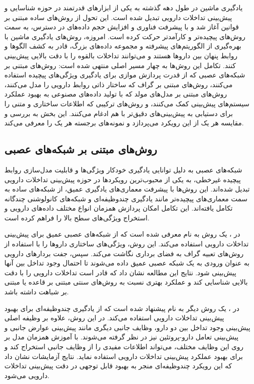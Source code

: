 یادگیری ماشین در طول دهه گذشته به یکی از ابزارهای قدرتمند در حوزه شناسایی و پیش‌بینی تداخلات دارویی تبدیل شده است. این تحول از روش‌های ساده مبتنی بر قوانین آغاز شد و با پیشرفت فناوری و افزایش حجم داده‌های در دسترس، به سمت روش‌های پیچیده‌تر و کارآمدتر حرکت کرده است. امروزه، روش‌های یادگیری ماشین با بهره‌گیری از الگوریتم‌های پیشرفته و مجموعه داده‌های بزرگ، قادر به کشف الگوها و روابط پنهان بین داروها هستند و می‌توانند تداخلات بالقوه را با دقت بالایی پیش‌بینی کنند. تکامل این روش‌ها به چهار مسیر اصلی منتهی شده است: روش‌های مبتنی بر شبکه‌های عصبی که از قدرت پردازش موازی برای یادگیری ویژگی‌های پیچیده استفاده می‌کنند، روش‌های مبتنی بر گراف که ساختار ذاتی روابط دارویی را مدل می‌کنند، روش‌های مبتنی بر مدل‌های مولد که با تولید داده‌های مصنوعی به بهبود عملکرد سیستم‌های پیش‌بینی کمک می‌کنند، و روش‌های ترکیبی که اطلاعات ساختاری و متنی را برای دستیابی به پیش‌بینی‌های دقیق‌تر با هم ادغام می‌کنند. این بخش به بررسی و مقایسه هر یک از این رویکرد می‌پردازد و نمونه‌های برجسته هر یک را معرفی می‌کند.

\subsection{روش‌های مبتنی بر شبکه‌های عصبی}

شبکه‌های عصبی به دلیل توانایی یادگیری خودکار ویژگی‌ها و قابلیت مدل‌سازی روابط پیچیده غیرخطی، به یکی از محبوب‌ترین رویکردها در حوزه پیش‌بینی تداخلات دارویی تبدیل شده‌اند. این روش‌ها با پیشرفت معماری‌های یادگیری عمیق، از شبکه‌های ساده به سمت معماری‌های پیچیده‌تر مانند یادگیری چندوظیفه‌ای و شبکه‌های کانولوشنی چندگانه تکامل یافته‌اند. این تکامل امکان پردازش همزمان انواع مختلف داده‌های دارویی و استخراج ویژگی‌های سطح بالا را فراهم کرده است.

در \cite{ref_ryu2018}، یک روش به نام  معرفی شده است که از شبکه‌های عصبی عمیق برای پیش‌بینی تداخلات دارویی استفاده می‌کند. این روش، ویژگی‌های ساختاری داروها را با استفاده از روش‌های تعبیه گراف به فضای برداری نگاشت می‌کند. سپس، جفت بردارهای دارویی به عنوان ورودی به یک شبکه عصبی عمیق داده می‌شوند تا احتمال وجود تداخل بین آنها پیش‌بینی شود. نتایج این مطالعه نشان داد که  قادر است تداخلات دارویی را با دقت بالایی شناسایی کند و عملکرد بهتری نسبت به روش‌های سنتی مبتنی بر قاعده یا مبتنی بر شباهت داشته باشد.

در \cite{ref_deng2020}، یک روش دیگر به نام  پیشنهاد شده است که از یادگیری چندوظیفه‌ای برای بهبود پیش‌بینی تداخلات دارویی استفاده می‌کند. در این روش، علاوه بر وظیفه اصلی پیش‌بینی وجود تداخل بین دو دارو، وظایف جانبی دیگری مانند پیش‌بینی عوارض جانبی و پیش‌بینی تعامل دارو-پروتئین نیز در نظر گرفته می‌شوند. با آموزش همزمان مدل بر روی این وظایف مختلف،  می‌تواند اطلاعات مفیدی را از وظایف جانبی استخراج کند و برای بهبود عملکرد پیش‌بینی تداخلات دارویی استفاده نماید. نتایج آزمایشات نشان داد که این رویکرد چندوظیفه‌ای منجر به بهبود قابل توجهی در دقت پیش‌بینی تداخلات دارویی می‌شود.

